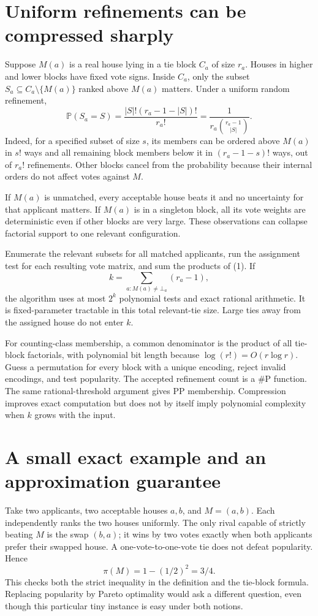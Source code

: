\documentclass[11pt]{article}
\newcommand{\Prb}{\mathbb P}
\begin{document}
\section*{Uniform refinements can be compressed sharply}
Suppose $M(a)$ is a real house lying in a tie block $C_a$ of size $r_a$. Houses in higher and lower blocks have fixed vote signs. Inside $C_a$, only the subset $S_a\subseteq C_a\setminus\{M(a)\}$ ranked above $M(a)$ matters. Under a uniform random refinement,
\[
 \Prb(S_a=S)=\frac{|S|!(r_a-1-|S|)!}{r_a!}
 =\frac{1}{r_a\binom{r_a-1}{|S|}}.\tag{1}
\]
Indeed, for a specified subset of size $s$, its members can be ordered above $M(a)$ in $s!$ ways and all remaining block members below it in $(r_a-1-s)!$ ways, out of $r_a!$ refinements. Other blocks cancel from the probability because their internal orders do not affect votes against $M$.

If $M(a)$ is unmatched, every acceptable house beats it and no uncertainty for that applicant matters. If $M(a)$ is in a singleton block, all its vote weights are deterministic even if other blocks are very large. These observations can collapse factorial support to one relevant configuration.

Enumerate the relevant subsets for all matched applicants, run the assignment test for each resulting vote matrix, and sum the products of (1). If
\[
 k=\sum_{a:M(a)\ne\bot_a}(r_a-1),
\]
the algorithm uses at most $2^k$ polynomial tests and exact rational arithmetic. It is fixed-parameter tractable in this total relevant-tie size. Large ties away from the assigned house do not enter $k$.

For counting-class membership, a common denominator is the product of all tie-block factorials, with polynomial bit length because $\log(r!)=O(r\log r)$. Guess a permutation for every block with a unique encoding, reject invalid encodings, and test popularity. The accepted refinement count is a \#P function. The same rational-threshold argument gives PP membership. Compression improves exact computation but does not by itself imply polynomial complexity when $k$ grows with the input.

\section*{A small exact example and an approximation guarantee}
Take two applicants, two acceptable houses $a,b$, and $M=(a,b)$. Each independently ranks the two houses uniformly. The only rival capable of strictly beating $M$ is the swap $(b,a)$; it wins by two votes exactly when both applicants prefer their swapped house. A one-vote-to-one-vote tie does not defeat popularity. Hence
\[
 \pi(M)=1-(1/2)^2=3/4.
\]
This checks both the strict inequality in the definition and the tie-block formula. Replacing popularity by Pareto optimality would ask a different question, even though this particular tiny instance is easy under both notions.
\end{document}

